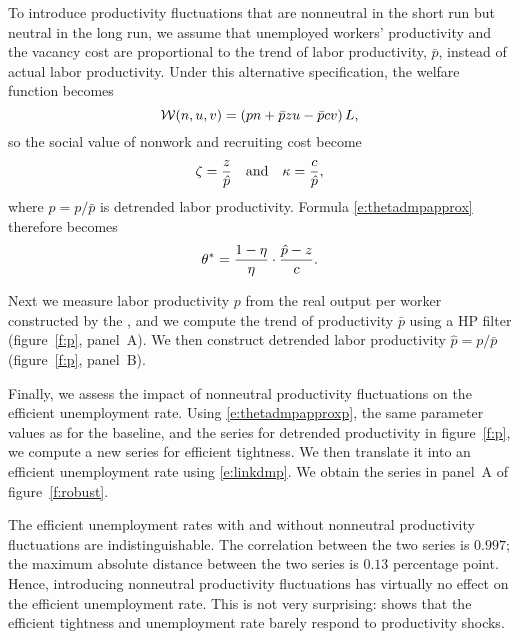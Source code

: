 \documentclass[letterpaper,12pt,leqno]{article}
\begin{document}
To introduce productivity fluctuations that are nonneutral in the short run but neutral in the long run, we assume that unemployed workers' productivity and the vacancy cost are proportional to the trend of labor productivity, $\bar{p}$, instead of actual labor productivity. Under this alternative specification, the welfare function becomes 
\begin{equation}
\mathcal{W}(n,u,v) = \left( p n + \bar{p} z u - \bar{p} c v \right) L,
\end{equation}
so the social value of nonwork and recruiting cost become
\begin{equation}
\zeta = \frac{z}{\hat{p}} \quad\text{and}\quad \kappa = \frac{c}{\hat{p}},
\end{equation}
where $\hat{p} = p/\bar{p}$ is detrended labor productivity. Formula \eqref{e:thetadmpapprox} therefore becomes
\begin{equation}
\theta^* =  \frac{1-\eta}{\eta} \cdot \frac{\hat{p}-z}{c}.
\label{e:thetadmpapproxp}\end{equation}

Next we measure labor productivity $p$ from the real output per worker constructed by the , and we compute the trend of productivity $\bar{p}$ using a HP filter (figure~\ref{f:p}, panel~A). We then construct detrended labor productivity $\hat{p} = p / \bar{p}$ (figure~\ref{f:p}, panel~B).

Finally, we assess the impact of nonneutral productivity fluctuations on the efficient unemployment rate. Using \eqref{e:thetadmpapproxp}, the same parameter values as for the baseline, and the series for detrended productivity in figure~\ref{f:p}, we compute a new series for efficient tightness. We then translate it into an efficient unemployment rate using \eqref{e:linkdmp}. We obtain the series in panel~A of figure~\ref{f:robust}.

The efficient unemployment rates with and without nonneutral productivity fluctuations are indistinguishable. The correlation between the two series is $0.997$; the maximum absolute distance between the two series is $0.13$ percentage point. Hence, introducing nonneutral productivity fluctuations has virtually no effect on the efficient unemployment rate. This is not very surprising:  shows that the efficient tightness and unemployment rate barely respond to productivity shocks.
\end{document}
